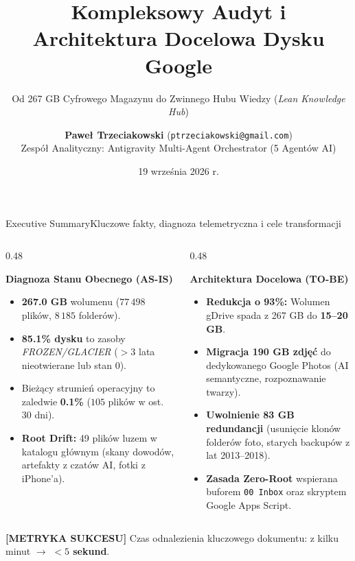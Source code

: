 \documentclass[aspectratio=169, 10pt]{beamer}
\title[\textbf{Architektura Docelowa Dysku Google}]{\textbf{Kompleksowy Audyt i Architektura Docelowa Dysku Google}}
\subtitle{Od 267 GB Cyfrowego Magazynu do Zwinnego Hubu Wiedzy (\textit{Lean Knowledge Hub})}
\author[\textbf{Paweł Trzeciakowski}]{\textbf{Paweł Trzeciakowski} (\texttt{ptrzeciakowski@gmail.com})\\[1ex]\footnotesize Zespół Analityczny: Antigravity Multi-Agent Orchestrator (5 Agentów AI)}
\institute[\textbf{Antigravity AI}]{\footnotesize Głęboka Analiza Telemetryczna bazy \texttt{metadata\_sqlite\_db} (DriveFS na macOS)}
\date{19 września 2026 r.}
\newcommand{\tagCard}[2]{{\setlength{\fboxsep}{2.5pt}\colorbox{brandLight}{\textcolor{brandNavy}{\sffamily\bfseries\scriptsize [#1]} \footnotesize #2}}}
\begin{document}
\begin{frame}[plain]
  \titlepage
\end{frame}

\begin{frame}{Executive Summary}{Kluczowe fakty, diagnoza telemetryczna i cele transformacji}
  \begin{columns}[T]
    \begin{column}{0.48\textwidth}
      \begin{block}{\textbf{Diagnoza Stanu Obecnego (AS-IS)}}
        \begin{itemize}
          \item \textbf{267.0 GB} wolumenu ($77\,498$ plików, $8\,185$ folderów).
          \item \alert{\textbf{85.1\% dysku}} to zasoby \textit{FROZEN/GLACIER} ($>3$ lata nieotwierane lub stan 0).
          \item Bieżący strumień operacyjny to zaledwie \textbf{0.1\%} ($105$ plików w ost. 30 dni).
          \item \textbf{Root Drift:} 49 plików luzem w katalogu głównym (skany dowodów, artefakty z czatów AI, fotki z iPhone'a).
        \end{itemize}
      \end{block}
    \end{column}

    \begin{column}{0.48\textwidth}
      \begin{exampleblock}{\textbf{Architektura Docelowa (TO-BE)}}
        \begin{itemize}
          \item \textbf{Redukcja o 93\%:} Wolumen gDrive spada z 267 GB do \textbf{15--20 GB}.
          \item \textbf{Migracja 190 GB zdjęć} do dedykowanego Google Photos (AI semantyczne, rozpoznawanie twarzy).
          \item \textbf{Uwolnienie 83 GB redundancji} (usunięcie klonów folderów foto, starych backupów z lat 2013--2018).
          \item \textbf{Zasada Zero-Root} wspierana buforem \texttt{00 Inbox} oraz skryptem Google Apps Script.
        \end{itemize}
      \end{exampleblock}
    \end{column}
  \end{columns}

  \vspace{0.3cm}
  \begin{center}
    \tagCard{METRYKA SUKCESU}{Czas odnalezienia kluczowego dokumentu: z kilku minut $\longrightarrow$ \textbf{$<5$ sekund}.}
  \end{center}
\end{frame}
\end{document}
